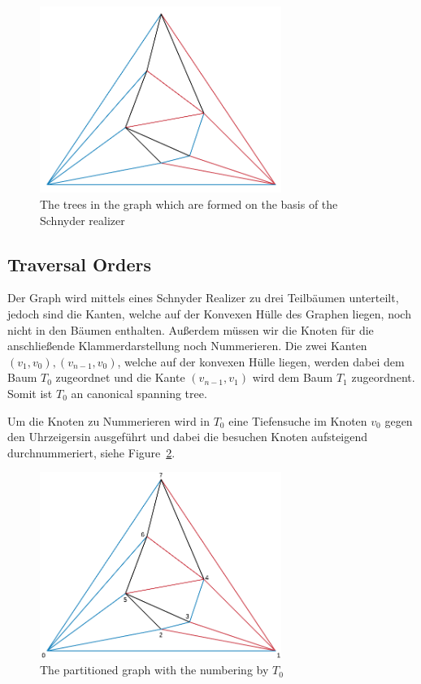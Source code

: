 \documentclass[a4paper]{scrartcl}
\begin{document}
\begin{figure}[h]
	\centering
	\includegraphics[width=0.7\textwidth]{img/exampleSchnyder}
	\caption{The trees in the graph which are formed on the basis of the Schnyder realizer}
	\label{fig:exampleSchnyder}
\end{figure}



\subsection{Traversal Orders}
Der Graph wird mittels  eines Schnyder Realizer zu drei Teilbäumen unterteilt, jedoch sind die Kanten, welche auf der Konvexen Hülle des Graphen liegen, noch nicht in den Bäumen enthalten. Außerdem müssen wir die Knoten für die anschließende Klammerdarstellung noch Nummerieren.
Die zwei Kanten $(v_1,v_0),(v_{n-1},v_0)$, welche auf der konvexen Hülle liegen, werden dabei dem Baum $T_0$ zugeordnet und die Kante $(v_{n-1},v_1)$ wird dem Baum $T_1$ zugeordnent. Somit ist $T_0$ an canonical spanning tree.

Um die Knoten zu Nummerieren wird in $T_0$ eine Tiefensuche im Knoten $v_0$ gegen den Uhrzeigersin ausgeführt und dabei die besuchen Knoten aufsteigend durchnummeriert, siehe Figure~\ref{fig:exampleTraversal}.

\begin{figure}[h]
	\centering
	\includegraphics[width=0.7\textwidth]{img/exampleTraversal}
	\caption{The partitioned graph with the numbering by $T_0$}
	\label{fig:exampleTraversal}
\end{figure}
\end{document}

